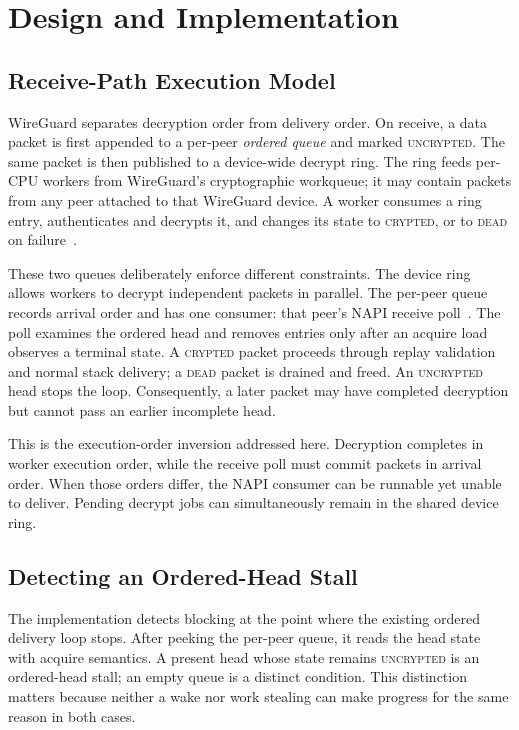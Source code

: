 \section{Design and Implementation}
\label{sec:design}
\begingroup
\setlength{\emergencystretch}{1.5em}

\subsection{Receive-Path Execution Model}
\label{sec:design-model}

WireGuard separates decryption order from delivery order.  On receive, a data
packet is first appended to a per-peer \emph{ordered queue} and marked
\textsc{uncrypted}.  The same packet is then published to a
device-wide decrypt ring.  The ring feeds per-CPU workers from WireGuard's
cryptographic workqueue; it may contain packets from any peer attached to that
WireGuard device.  A worker consumes a ring entry, authenticates and decrypts
it, and changes its state to \textsc{crypted}, or to \textsc{dead} on
failure~\cite{wireguard-linux,linux-workqueue}.

These two queues deliberately enforce different constraints.  The device ring
allows workers to decrypt independent packets in parallel.  The per-peer queue
records arrival order and has one consumer: that peer's NAPI receive
poll~\cite{linux-napi}.  The poll examines the ordered head and removes entries
only after an acquire load observes a terminal state.  A \textsc{crypted}
packet proceeds through replay validation and normal stack delivery; a
\textsc{dead} packet is drained and freed.  An \textsc{uncrypted} head stops
the loop.  Consequently, a later packet may have completed decryption but
cannot pass an earlier incomplete head.

This is the execution-order inversion addressed here.  Decryption completes in
worker execution order, while the receive poll must commit packets in arrival
order.  When those orders differ, the NAPI consumer can be runnable yet unable
to deliver.  Pending decrypt jobs can simultaneously remain in the shared
device ring.

\subsection{Detecting an Ordered-Head Stall}
\label{sec:design-detection}

The implementation detects blocking at the point where the existing ordered
delivery loop stops.  After peeking the per-peer queue, it reads the head state
with acquire semantics.  A present head whose state remains
\textsc{uncrypted} is an ordered-head stall; an empty queue is a distinct
condition.  This distinction matters because neither a wake nor work stealing
can make progress for the same reason in both cases.

